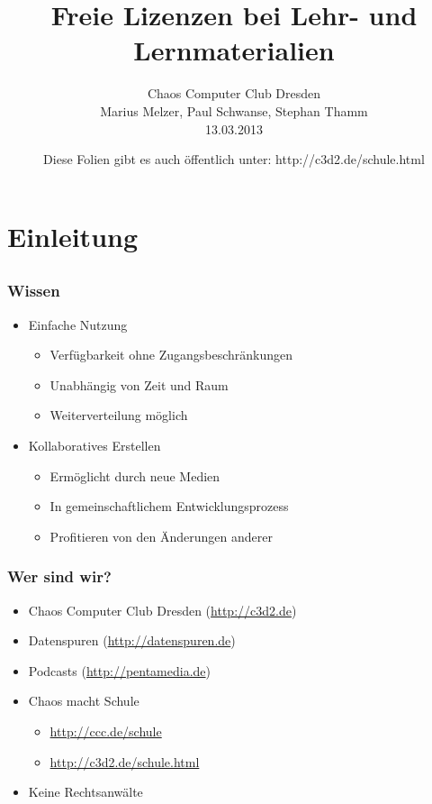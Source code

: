 \documentclass[table]{beamer}
\title{Freie Lizenzen bei Lehr- und Lernmaterialien}
\author{Chaos Computer Club Dresden\\Marius Melzer, Paul Schwanse, Stephan Thamm\\13.03.2013}
\date{Diese Folien gibt es auch öffentlich unter: http://c3d2.de/schule.html}
\begin{document}
\maketitle

\frame{\tableofcontents[hideallsubsections]}

\section{Einleitung}
\subsection{}

\begin{frame}
    \frametitle{Wissen}
    \begin{itemize}
      \item<2-> Einfache Nutzung
      \begin{itemize}
        \item<3-> Verfügbarkeit ohne Zugangsbeschränkungen
        \item<4-> Unabhängig von Zeit und Raum
        \item<5-> Weiterverteilung möglich
      \end{itemize}
      \item<6-> Kollaboratives Erstellen
      \begin{itemize}
        \item<7-> Ermöglicht durch neue Medien
        \item<8-> In gemeinschaftlichem Entwicklungsprozess
        \item<9-> Profitieren von den Änderungen anderer
      \end{itemize}
    \end{itemize}
\end{frame}
 
\begin{frame}
    \frametitle{Wer sind wir?}
    \begin{itemize}
        \item<2-> Chaos Computer Club Dresden (\url{http://c3d2.de})
            \note{}
        \item<3-> Datenspuren (\url{http://datenspuren.de})
        \item<4-> Podcasts (\url{http://pentamedia.de})
        \item<5-> Chaos macht Schule
            \begin{itemize}
                \item<2-> \url{http://ccc.de/schule}
                \item<2-> \url{http://c3d2.de/schule.html}
            \end{itemize}
        \item<6-> Keine Rechtsanwälte
    \end{itemize}
\end{frame}
\end{document}
